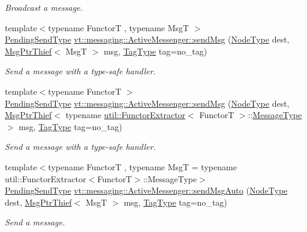 \begin{DoxyCompactItemize}
\begin{DoxyCompactList}\small\item\em Broadcast a message. \end{DoxyCompactList}\item 
{\footnotesize template$<$typename FunctorT , typename MsgT $>$ }\\\hyperlink{structvt_1_1messaging_1_1_active_messenger_a3626a6ca76d8ad4ec7c3b47a2c70d3a8}{Pending\+Send\+Type} \hyperlink{group__functorsend_gaab0dc380a72f038f4fc2350ba89de98f}{vt\+::messaging\+::\+Active\+Messenger\+::send\+Msg} (\hyperlink{namespacevt_a866da9d0efc19c0a1ce79e9e492f47e2}{Node\+Type} dest, \hyperlink{structvt_1_1messaging_1_1_msg_ptr_thief}{Msg\+Ptr\+Thief}$<$ MsgT $>$ msg, \hyperlink{namespacevt_a84ab281dae04a52a4b243d6bf62d0e52}{Tag\+Type} tag=no\+\_\+tag)
\begin{DoxyCompactList}\small\item\em Send a message with a type-\/safe handler. \end{DoxyCompactList}\item 
{\footnotesize template$<$typename FunctorT $>$ }\\\hyperlink{structvt_1_1messaging_1_1_active_messenger_a3626a6ca76d8ad4ec7c3b47a2c70d3a8}{Pending\+Send\+Type} \hyperlink{group__functorsend_ga44951ad2da6d9e1eb688d3f730a54db3}{vt\+::messaging\+::\+Active\+Messenger\+::send\+Msg} (\hyperlink{namespacevt_a866da9d0efc19c0a1ce79e9e492f47e2}{Node\+Type} dest, \hyperlink{structvt_1_1messaging_1_1_msg_ptr_thief}{Msg\+Ptr\+Thief}$<$ typename \hyperlink{structvt_1_1util_1_1_functor_extractor}{util\+::\+Functor\+Extractor}$<$ FunctorT $>$\+::\hyperlink{structvt_1_1messaging_1_1_active_messenger_a720a2b1e7462d414b2a51d9fe005eca9}{Message\+Type} $>$ msg, \hyperlink{namespacevt_a84ab281dae04a52a4b243d6bf62d0e52}{Tag\+Type} tag=no\+\_\+tag)
\begin{DoxyCompactList}\small\item\em Send a message with a type-\/safe handler. \end{DoxyCompactList}\item 
{\footnotesize template$<$typename FunctorT , typename MsgT  = typename util\+::\+Functor\+Extractor$<$\+Functor\+T$>$\+::\+Message\+Type$>$ }\\\hyperlink{structvt_1_1messaging_1_1_active_messenger_a3626a6ca76d8ad4ec7c3b47a2c70d3a8}{Pending\+Send\+Type} \hyperlink{group__functorsend_ga902007cdc61f7c93e694b7c4c89d7ee1}{vt\+::messaging\+::\+Active\+Messenger\+::send\+Msg\+Auto} (\hyperlink{namespacevt_a866da9d0efc19c0a1ce79e9e492f47e2}{Node\+Type} dest, \hyperlink{structvt_1_1messaging_1_1_msg_ptr_thief}{Msg\+Ptr\+Thief}$<$ MsgT $>$ msg, \hyperlink{namespacevt_a84ab281dae04a52a4b243d6bf62d0e52}{Tag\+Type} tag=no\+\_\+tag)
\begin{DoxyCompactList}\small\item\em Send a message. \end{DoxyCompactList}\end{DoxyCompactItemize}


